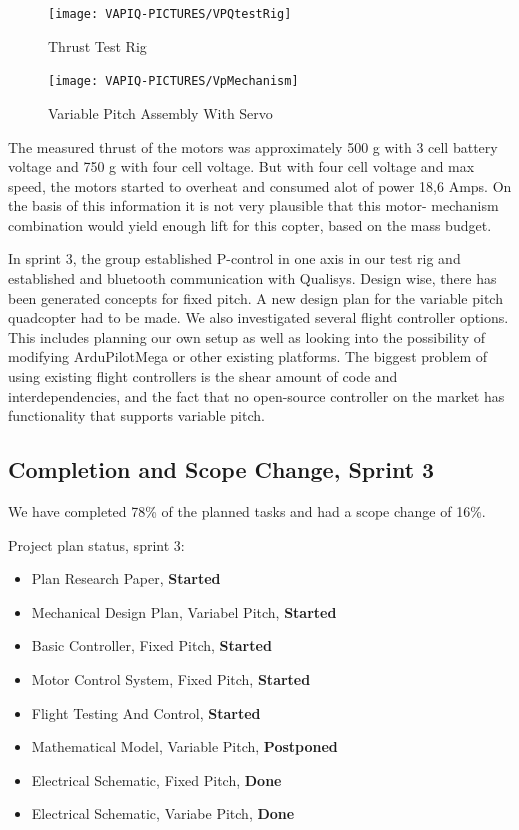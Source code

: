 \begin{figure}[h]
        \centering
         \begin{minipage}[b]{0.4\textwidth}
            \texttt{[image: VAPIQ-PICTURES/VPQtestRig]}
              \caption{Thrust Test Rig}
            \label{fig:testpic2}
        \end{minipage}
        \hfill
        \begin{minipage}[b]{0.4\textwidth}
            \texttt{[image: VAPIQ-PICTURES/VpMechanism]}
            \caption{Variable Pitch Assembly With Servo}
            \label{fig:testpic3}
        \end{minipage}
\end{figure}


The measured thrust of the motors was approximately 500 g with 3 cell battery voltage and 750 g with four cell voltage. But with four cell voltage and max speed, the motors started to overheat and consumed alot of power 18,6 Amps. On the basis of this information it is not very plausible that this motor- mechanism combination would yield enough lift for this copter, based on the mass budget.

In sprint 3, the group established P-control in one axis in our test rig and established and bluetooth communication with Qualisys. Design wise, there has been generated concepts for fixed pitch. A new design plan for the variable pitch quadcopter had to be made. We also investigated several flight controller options. This includes planning our own setup as well as looking into the possibility of modifying ArduPilotMega or other existing platforms. The biggest problem of using existing flight controllers is the shear amount of code and interdependencies, and the fact that no open-source controller on the market has functionality that supports variable pitch. 

\newpage
\subsection{Completion and Scope Change, Sprint 3}

We have completed 78\% of the planned tasks and had a scope change of 16\%.

Project plan status, sprint 3:


\begin{itemize}
\item Plan Research Paper, \textbf{Started}
\item Mechanical Design Plan, Variabel Pitch, \textbf{Started}
\item Basic Controller, Fixed Pitch, \textbf{Started}
\item Motor Control System, Fixed Pitch, \textbf{Started}
\item Flight Testing And Control, \textbf{Started}
\item Mathematical Model, Variable Pitch, \textbf{Postponed}
\item Electrical Schematic, Fixed Pitch, \textbf{Done}
\item Electrical Schematic, Variabe Pitch, \textbf{Done}
	\end{itemize}


